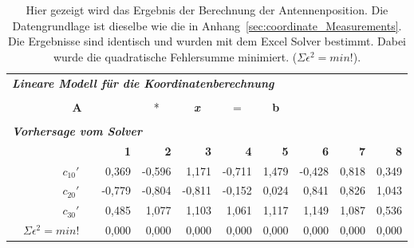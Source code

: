 \begin{table}[h]
  \caption{Hier gezeigt wird das Ergebnis der Berechnung der Antennenposition. Die Datengrundlage ist dieselbe wie die in Anhang~\ref{sec:coordinate_Measurements}. Die Ergebnisse sind identisch und wurden mit dem Excel Solver bestimmt. Dabei wurde die quadratische Fehlersumme minimiert. ($\Sigma\epsilon^2 = min!$).}
    \vspace{0.5cm}
    \begin{tabular}{r|rrr|r|r|r|r|rrr}
 	\multicolumn{11}{l}{\textit{\textbf{Lineare Modell für die Koordinatenberechnung}}} \\

    \multicolumn{1}{r}{} & \multicolumn{1}{c}{\textbf{}} & \multicolumn{1}{c}{\textbf{}} & \multicolumn{1}{c}{\textbf{}} & \multicolumn{1}{r}{} & \multicolumn{1}{c}{\textit{\textbf{}}} & \multicolumn{1}{r}{} & \multicolumn{1}{c}{\textbf{}} &       &       &  \\
    \multicolumn{1}{r}{} & \multicolumn{3}{c}{\textbf{A}} & \multicolumn{1}{c}{*} & \multicolumn{1}{c}{\textit{\textbf{x}}} & \multicolumn{1}{c}{=} & \multicolumn{1}{c}{\textbf{b}} & \textbf{} &       &  \\
    \multicolumn{11}{r}{} \\
    \multicolumn{11}{l}{\textit{\textbf{Vorhersage vom Solver}}} \\
    \multicolumn{1}{r}{} &       &       & \multicolumn{1}{r}{\textbf{1}} & \multicolumn{1}{r}{\textbf{2}} & \multicolumn{1}{r}{\textbf{3}} & \multicolumn{1}{r}{\textbf{4}} & \multicolumn{1}{r}{\textbf{5}} & \textbf{6} & \textbf{7} & \textbf{8} \\
\cline{2-11}    \multicolumn{1}{r}{} & $c_{10}'$ &       & \multicolumn{1}{r}{0,369} & \multicolumn{1}{r}{-0,596} & \multicolumn{1}{r}{1,171} & \multicolumn{1}{r}{-0,711} & \multicolumn{1}{r}{1,479} & -0,428 & 0,818 & 0,349 \\
    \multicolumn{1}{r}{} & $c_{20}'$ &       & \multicolumn{1}{r}{-0,779} & \multicolumn{1}{r}{-0,804} & \multicolumn{1}{r}{-0,811} & \multicolumn{1}{r}{-0,152} & \multicolumn{1}{r}{0,024} & 0,841 & 0,826 & 1,043 \\
    \multicolumn{1}{r}{} & {$c_{30}'$} &       & \multicolumn{1}{r}{0,485} & \multicolumn{1}{r}{1,077} & \multicolumn{1}{r}{1,103} & \multicolumn{1}{r}{1,061} & \multicolumn{1}{r}{1,117} & 1,149 & 1,087 & 0,536 \\
    \multicolumn{1}{r}{} & $\Sigma\epsilon^2=min!$ &       & \multicolumn{1}{r}{0,000} & \multicolumn{1}{r}{0,000} & \multicolumn{1}{r}{0,000} & \multicolumn{1}{r}{0,000} & \multicolumn{1}{r}{0,000} & 0,000 & 0,000 & 0,000 \\

\end{tabular}
\end{table}

